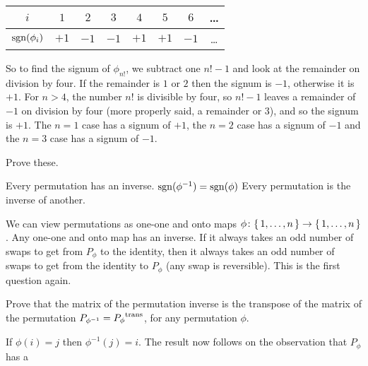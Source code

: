 \begin{exercises}
\begin{answer}
\begin{center}
         \begin{tabular}[b]{c|ccccccc}
           \( i \) &\( 1 \) &\( 2 \) &\( 3 \) &\( 4 \) &\( 5 \)
              &\( 6 \) &\ldots \\
           \hline
           \( \operatorname{sgn}(\phi_i) \) &\( +1 \) &\( -1 \) &\( -1 \) &\( +1 \)
              &\( +1 \) &\( -1 \) &\ldots
         \end{tabular}
      \end{center}  
      So to find the signum of $\phi_{n!}$, we subtract one $n!-1$ and
      look at the remainder on division by four.
      If the remainder is $1$ or $2$ then the signum is $-1$, otherwise it
      is $+1$.
      For $n>4$, the number $n!$ is divisible by four, so $n!-1$ leaves a 
      remainder of $-1$ on division by four (more properly said, a remainder
      or $3$), and so the signum is $+1$.
      The $n=1$ case has a signum of $+1$, the $n=2$ case has a signum of 
      $-1$ and the $n=3$ case has a signum of $-1$.
    \end{answer}
  \item \label{exer:PermInvFacts}
     Prove these.   
     \begin{exparts}
        \partsitem Every permutation has an inverse.
        \partsitem \( \operatorname{sgn}(\phi^{-1})=\operatorname{sgn}(\phi) \)
        \partsitem Every permutation is the inverse of another.
     \end{exparts}
    \begin{answer}
      \begin{exparts}
       \partsitem We can view permutations as one-one and onto maps
         \( \mbox{$\phi\colon \mbox{$\{\,1,\ldots,n\,\}$}\to \mbox{$\{\,1,\ldots,n\,\}$}$} \).
         Any one-one and onto map has an inverse.
       \partsitem If it always takes an odd number of swaps to get 
         from \( P_\phi \)
         to the identity, then it always takes an odd number of swaps
         to get from the identity to \( P_\phi \) (any swap is reversible).
       \partsitem This is the first question again.
     \end{exparts}  
    \end{answer}
  \item \label{exer:PermInvIffMatTrans}
      Prove that the matrix of the permutation inverse
      is the transpose of the matrix of the permutation 
      $P_{\phi^{-1}}={{P_{\phi}}^{\rm trans}}$, 
      for any permutation $\phi$.
      \begin{answer}
        If $\phi(i)=j$ then $\phi^{-1}(j)=i$.
        The result now follows on the observation that $P_{\phi}$ has a 

\end{answer}
\end{exercises}
